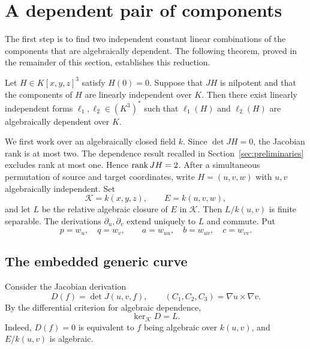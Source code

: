 \section{A dependent pair of components}\label{sec:dependent-pair}

The first step is to find two independent constant linear combinations of the components that are algebraically dependent. The following theorem, proved in the remainder of this section, establishes this reduction.

\begin{theorem}\label{thm:dependent-pair}
Let $H\in K[x,y,z]^3$ satisfy $H(0)=0$. Suppose that $JH$ is nilpotent and that the components of $H$ are linearly independent over $K$. Then there exist linearly independent forms $\ell_1,\ell_2\in(K^3)^*$ such that $\ell_1(H)$ and $\ell_2(H)$ are algebraically dependent over $K$.
\end{theorem}

We first work over an algebraically closed field $k$. Since $\det JH=0$, the Jacobian rank is at most two. The dependence result recalled in Section~\ref{sec:preliminaries} excludes rank at most one. Hence $\operatorname{rank} JH=2$. After a simultaneous permutation of source and target coordinates, write $H=(u,v,w)$ with $u,v$ algebraically independent. Set
\[
 \mathcal K=k(x,y,z),\qquad E=k(u,v,w),
\]
and let $L$ be the relative algebraic closure of $E$ in $\mathcal K$. Then $L/k(u,v)$ is finite separable. The derivations $\partial_u,\partial_v$ extend uniquely to $L$ and commute. Put
\begin{equation}\label{eq:surface-derivatives}
 p=w_u,\quad q=w_v,\qquad a=w_{uu},\quad b=w_{uv},\quad c=w_{vv}.
\end{equation}

\subsection{The embedded generic curve}
Consider the Jacobian derivation
\[
 D(f)=\det J(u,v,f),\qquad (C_1,C_2,C_3)=\nabla u\times\nabla v.
\]
By the differential criterion for algebraic dependence,
\begin{equation}\label{eq:kernel-D}
 \ker_{\mathcal K}D=L.
\end{equation}
Indeed, $D(f)=0$ is equivalent to $f$ being algebraic over $k(u,v)$, and $E/k(u,v)$ is algebraic.

